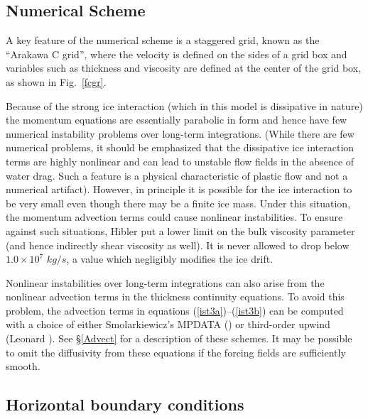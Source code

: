 \subsection{Numerical Scheme}

A key feature of the numerical scheme is a staggered grid, known as
the ``Arakawa C grid'', where the velocity is defined on the sides of a
grid box and variables such as thickness and viscosity are defined
at the center of the grid box, as shown in Fig.\ \ref{fcgr}.

Because of the strong ice interaction (which in this model is
dissipative in nature) the momentum equations are essentially
parabolic in form and hence have few numerical instability problems
over long-term integrations.  (While there are few numerical
problems, it should be emphasized that the dissipative ice
interaction terms are highly nonlinear and can lead to unstable flow
fields in the absence of water drag.  Such a feature is a physical
characteristic of plastic flow and not a numerical artifact).
However, in principle it is possible for the ice interaction to be
very small even though there may be a finite ice mass.  Under this
situation, the momentum advection terms could cause nonlinear
instabilities.  To ensure against such situations, Hibler put a lower
limit on the bulk viscosity parameter
(and hence indirectly shear viscosity as well). It is never
allowed to drop below $1.0 \times 10^7$ $kg/s$, a value which
negligibly modifies the ice drift.

Nonlinear instabilities over long-term integrations can also arise from
the nonlinear advection terms in the thickness continuity equations.
To avoid this problem, the advection terms in equations
(\ref{ist3a})--(\ref{ist3b}) can be computed with a choice of either
Smolarkiewicz's MPDATA (\cite{Smolark90}) or third-order upwind
(Leonard \cite{Leonard79}). See \S\ref{Advect} for a description of
these schemes. It may be possible to omit the diffusivity from these
equations if the forcing fields are sufficiently smooth.

\subsection{Horizontal boundary conditions}

